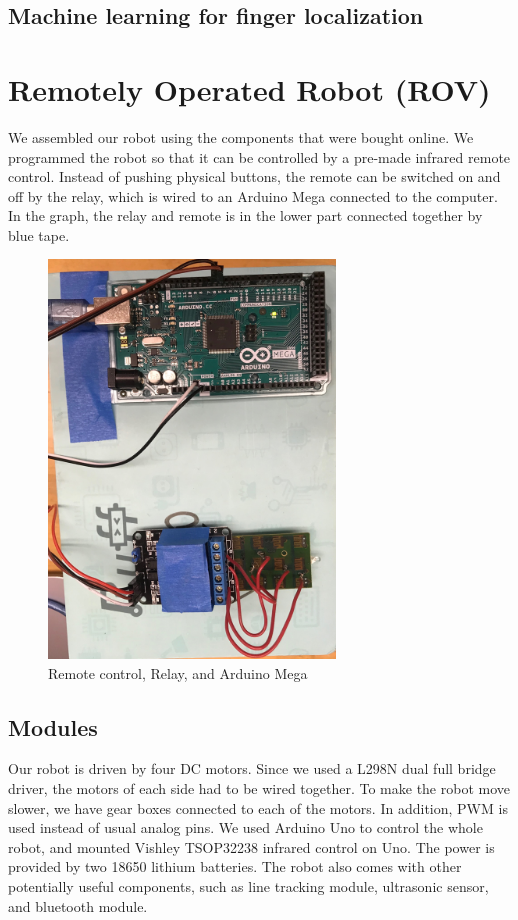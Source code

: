 \documentclass[reprint,amsmath, amsfonts, amssymb, aps, letterpaper]{revtex4-1}
\begin{document}
\subsection{Machine learning for finger localization}

\section{Remotely Operated Robot (ROV)}
We assembled our robot using the components that were bought online. We programmed the robot so that it can be controlled by a pre-made infrared remote control. Instead of pushing physical buttons, the remote can be switched on and off by the relay, which is wired to an Arduino Mega connected to the computer. In the graph, the relay and remote is in the lower part connected together by blue tape.

\begin{figure}[!htb]
\begin{center}
\includegraphics[width=3in]{relay.jpg}
\caption{Remote control, Relay, and Arduino Mega}
\label{fig1}
\end{center}
\end{figure}

\subsection{Modules}
Our robot is driven by four DC motors. Since we used a L298N dual full bridge driver, the motors of each side had to be wired together. To make the robot move slower, we have gear boxes connected to each of the motors. In addition, PWM is used instead of usual analog pins. We used Arduino Uno to control the whole robot, and mounted Vishley TSOP32238 infrared control on Uno. The power is provided by two 18650 lithium batteries. The robot also comes with other potentially useful components, such as line tracking module, ultrasonic sensor, and bluetooth module.
\end{document}

